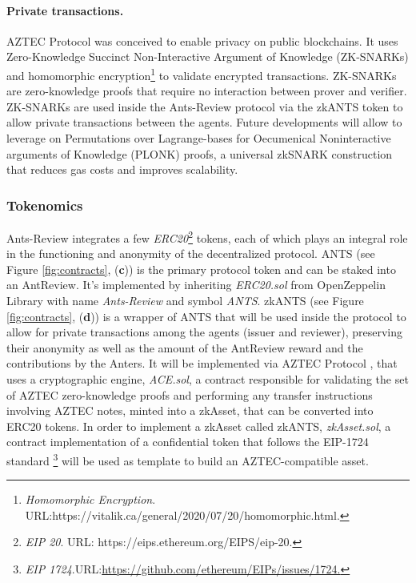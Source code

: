 \documentclass[runningheads]{llncs}
\begin{document}
\paragraph{\textbf{Private transactions}.}AZTEC Protocol  was conceived to enable privacy on public blockchains. It uses Zero-Knowledge Succinct Non-Interactive Argument of Knowledge (ZK-SNARKs)\cite{zSNARK} and homomorphic encryption\footnote[11]{\emph{Homomorphic Encryption}. \textsc{URL:}\newline https://vitalik.ca/general/2020/07/20/homomorphic.html.} to validate encrypted transactions. ZK-SNARKs are zero-knowledge proofs that require no interaction between prover and verifier. ZK-SNARKs are used inside the Ants-Review protocol via the zkANTS token to allow private transactions between the agents. Future developments will allow to leverage on Permutations over Lagrange-bases for Oecumenical Noninteractive arguments of Knowledge (PLONK) \cite{PLONK} proofs, a universal zkSNARK construction that reduces gas costs and improves scalability.

\subsubsection{Tokenomics}
Ants-Review integrates a few \emph{ERC20}\footnote[12]{\emph{EIP 20}. \textsc{URL:} https://eips.ethereum.org/EIPS/eip-20.} tokens, each of which plays an integral role in the functioning and anonymity of the decentralized protocol.
\newline ANTS (see Figure \ref{fig:contracts}, (\textbf{c})) is the primary protocol token and can be staked into an AntReview. It's implemented by inheriting \emph{ERC20.sol} from OpenZeppelin Library with name \emph{Ants-Review} and symbol \emph{ANTS}.
\newline zkANTS (see Figure \ref{fig:contracts}, (\textbf{d})) is a wrapper of ANTS that will be used inside the protocol to allow for private transactions among the agents (issuer and reviewer), preserving their anonymity as well as the amount of the AntReview reward and the contributions by the Anters. It will be implemented via AZTEC Protocol \cite{AZTEC}, that uses a cryptographic engine, \emph{ACE.sol}, a contract responsible for validating the set of AZTEC zero-knowledge proofs and performing any transfer instructions involving AZTEC notes, minted into a zkAsset, that can be converted into ERC20 tokens. In order to implement a zkAsset called zkANTS, \emph{zkAsset.sol}, a contract implementation of a confidential token that follows the EIP-1724 standard \footnote[13]{\emph{EIP  1724}.\textsc{URL:}\url{https://github.com/ethereum/EIPs/issues/1724.}} will be used as template to build an AZTEC-compatible asset.
\end{document}
